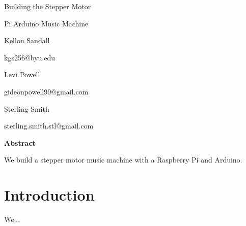 \documentclass[12pt,letterpaper]{article}
\begin{document}
	
	\vspace*{2cm}
	
	\begin{center}
		\Large Building the Stepper Motor 
		
		Pi Arduino Music Machine
		
		\vspace{3cm}
		
		\large 
		Kellon Sandall
		
		kgs256@byu.edu
		
		\vspace{24pt}
		
		Levi Powell
		
		gideonpowell99@gmail.com
		
		\vspace{24pt}
		
		Sterling Smith
		
		sterling.smith.stl@gmail.com
	\end{center}
	
	
	\pagebreak
	
	\large \textbf{Abstract}
	
	\normalsize
	
	We build a stepper motor music machine with a Raspberry Pi and Arduino. 
	
	
	\section{Introduction}
	
	We... 
	
\end{document}
